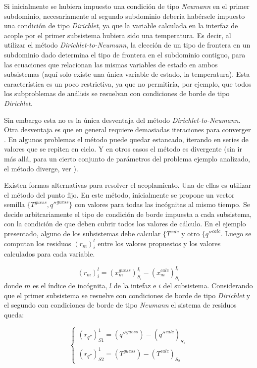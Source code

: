 Si inicialmente se hubiera impuesto una condición de tipo \textit{Neumann} en el primer subdominio, 
necesariamente al segundo subdominio debería habérsele impuesto una condición de tipo \textit{Dirichlet},
ya que la variable calculada en la interfaz de acople por el primer subsistema hubiera sido una temperatura.
Es decir, al utilizar el método \textit{Dirichlet-to-Neumann}, la elección de un tipo de frontera en un subdominio dado determina el tipo de frontera en el subdominio contiguo,
para las ecuaciones que relacionan las mismas variables de estado en ambos subsistemas (aquí solo existe una única variable de estado, la temperatura).
Esta característica es un poco restrictiva, ya que no permitiría, por ejemplo, que todos los subproblemas de análisis se resuelvan con condiciones de borde de tipo \textit{Dirichlet}.

Sin embargo esta no es la única desventaja del método \textit{Dirichlet-to-Neumann}.
Otra desventaja es que en general requiere demasiadas iteraciones para converger \cite{fede-enief2016}.
En algunos problemas el método puede quedar estancado, iterando en series de valores que se repiten en ciclo.
Y en otros casos el método es divergente (sin ir más allá, para un cierto conjunto de parámetros del problema ejemplo analizado, el método diverge, ver \cite{coup-strong}).

Existen formas alternativas para resolver el acoplamiento.
Una de ellas es utilizar el método del punto fijo.
En este método, inicialmente se propone un vector semilla $\{T^{guess},q''^{guess}\}$ con valores para todas las incógnitas al mismo tiempo.
Se decide arbitrariamente el tipo de condición de borde impuesta a cada subsistema, con la condición de que deben cubrir todos los valores de cálculo.
En el ejemplo presentado, alguno de los subsistemas debe calcular $\{T^{calc}$ y otro $\{q''^{calc}$.
Luego se computan los residuos $(r_m)_{i}^{l}$ entre los valores propuestos y los valores calculados para cada variable.

\begin{equation}
(r_m)_{i}^{l} = (x_{m}^{guess})_{S_i}^{I_l} - (x_{m}^{calc})_{S_i}^{I_l}
\label{ecuaciones-residuos}
\end{equation}
donde $m$ es el índice de incógnita, $l$ de la intefaz e $i$ del subsistema.
Considerando que el primer subsistema se resuelve con condiciones de borde de tipo \textit{Dirichlet} y el segundo con condiciones de borde de tipo \textit{Neumann}
el sistema de residuos queda:

\begin{equation}
\left\{\begin{matrix}
(r_{q''})_{S1}^{1}  = (q''^{ guess}) - (q''^{calc})_{S_1} \\
(r_{q''})_{S2}^{1}  = (T^{guess}) - (T^{calc})_{S_2}
\end{matrix}\right.
\label{res_qt}
\end{equation}

